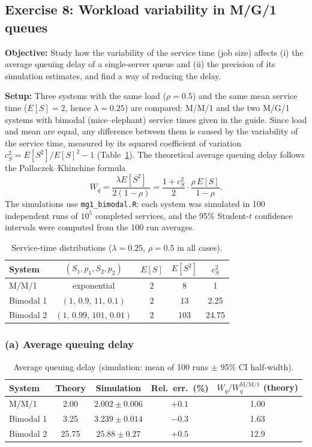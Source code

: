 ﻿\documentclass[12pt]{article}
\begin{document}
\subsection{Exercise 8: Workload variability in M/G/1 queues}

\textbf{Objective:} Study how the variability of the service time (job size)
affects (i) the average queuing delay of a single-server queue and (ii) the
precision of its simulation estimates, and find a way of reducing the delay.

\textbf{Setup:} Three systems with the same load ($\rho=0.5$) and the same
mean service time ($E[S]=2$, hence $\lambda=0.25$) are compared: M/M/1 and the
two M/G/1 systems with bimodal (mice--elephant) service times given in the
guide. Since load and mean are equal, any difference between them is caused by
the variability of the service time, measured by its squared coefficient of
variation $c_S^2=E[S^2]/E[S]^2-1$ (Table~\ref{tab:wl-systems}). The theoretical
average queuing delay follows the Pollaczek--Khinchine formula
\[
W_q=\frac{\lambda E[S^2]}{2(1-\rho)}=\frac{1+c_S^2}{2}\cdot\frac{\rho\,E[S]}{1-\rho}.
\]
The simulations use \texttt{mg1\_bimodal.R}: each system was simulated in 100
independent runs of $10^5$ completed services, and the 95\% Student-$t$
confidence intervals were computed from the 100 run averages.

\begin{table}[H]
    \centering
    \caption{Service-time distributions ($\lambda=0.25$, $\rho=0.5$ in all cases).}
    \label{tab:wl-systems}
    \begin{tabular}{lcccc}
        System & $(S_1,p_1,S_2,p_2)$ & $E[S]$ & $E[S^2]$ & $c_S^2$ \\
        \hline
        M/M/1      & exponential               & 2 & 8   & 1     \\
        Bimodal 1  & $(1,\,0.9,\,11,\,0.1)$    & 2 & 13  & 2.25  \\
        Bimodal 2  & $(1,\,0.99,\,101,\,0.01)$ & 2 & 103 & 24.75 \\
    \end{tabular}
\end{table}

\subsubsection{(a) Average queuing delay}

\begin{table}[H]
    \centering
    \caption{Average queuing delay (simulation: mean of 100 runs $\pm$ 95\% CI half-width).}
    \label{tab:wl-delay}
    \begin{tabular}{l|ccc|c}
        System & Theory & Simulation & Rel.\ err.\ (\%) & $W_q/W_q^{\mathrm{M/M/1}}$ (theory) \\
        \hline
        M/M/1     & 2.00  & $2.002\pm0.006$ & $+0.1$ & 1.00 \\
        Bimodal 1 & 3.25  & $3.239\pm0.014$ & $-0.3$ & 1.63 \\
        Bimodal 2 & 25.75 & $25.88\pm0.27$  & $+0.5$ & 12.9 \\
    \end{tabular}
\end{table}
\end{document}
